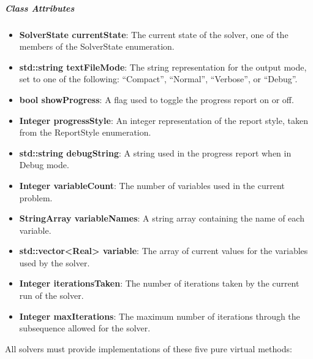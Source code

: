 \subparagraph{\textit{Class Attributes}}
\begin{itemize}
\item \textbf{SolverState currentState}: The current state of the solver, one of the members of the
SolverState enumeration.
\item \textbf{std::string textFileMode}: The string representation for the output mode, set to one
of the following: ``Compact'', ``Normal'', ``Verbose'', or ``Debug''.
\item \textbf{bool showProgress}: A flag used to toggle the progress report on or off.
\item \textbf{Integer progressStyle}: An integer representation of the report style, taken from the
ReportStyle enumeration.
\item \textbf{std::string debugString}: A string used in the progress report when in Debug mode.
\item \textbf{Integer variableCount}: The number of variables used in the current problem.
\item \textbf{StringArray variableNames}: A string array containing the name of each variable.
\item \textbf{std::vector<Real> variable}: The array of current values for the variables used by the
solver.
\item \textbf{Integer iterationsTaken}: The number of iterations taken by the current run of the
solver.
\item \textbf{Integer maxIterations}: The maximum number of iterations through the subsequence
allowed for the solver.
\end{itemize}

\noindent All solvers must provide implementations of these five pure virtual methods:

